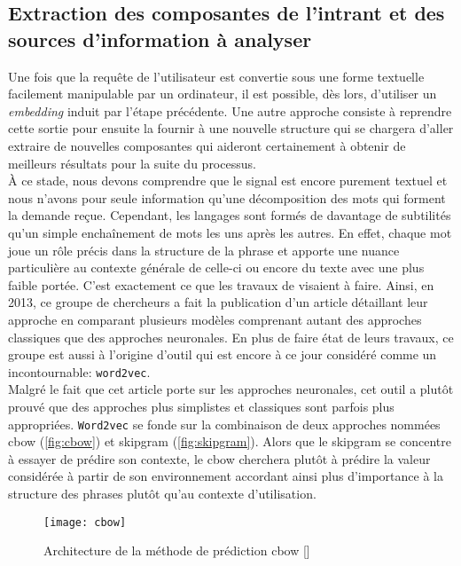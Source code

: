 \subsection{Extraction des composantes de l'intrant et des sources d'information à analyser}
Une fois que la requête de l'utilisateur est convertie sous une forme textuelle facilement manipulable par un ordinateur, il est possible, dès lors, d'utiliser un \textit{embedding} induit par l'étape précédente. Une autre approche consiste à reprendre cette sortie pour ensuite la fournir à une nouvelle structure qui se chargera d'aller extraire de nouvelles composantes qui aideront certainement à obtenir de meilleurs résultats pour la suite du processus. \\

À ce stade, nous devons comprendre que le signal est encore purement textuel et nous n'avons pour seule information qu'une décomposition des mots qui forment la demande reçue. Cependant, les langages sont formés de davantage de subtilités qu'un simple enchaînement de mots les uns après les autres. En effet, chaque mot joue un rôle précis dans la structure de la phrase et apporte une nuance particulière au contexte générale de celle-ci ou encore du texte avec une plus faible portée. C'est exactement ce que les travaux de \cite{word2vec} visaient à faire. Ainsi, en 2013, ce groupe de chercheurs a fait la publication d'un article détaillant leur approche en comparant plusieurs modèles comprenant autant des approches classiques que des approches neuronales. En plus de faire état de leurs travaux, ce groupe est aussi à l'origine d'outil qui est encore à ce jour considéré comme un incontournable: \texttt{word2vec}. \\

Malgré le fait que cet article porte sur les approches neuronales, cet outil a plutôt prouvé que des approches plus simplistes et classiques sont parfois plus appropriées. \texttt{Word2vec} se fonde sur la combinaison de deux approches nommées \gls{cbow} (\autoref{fig:cbow}) et \gls{skipgram} (\autoref{fig:skipgram}). Alors que le \gls{skipgram} se concentre à essayer de prédire son contexte, le \gls{cbow} cherchera plutôt à prédire la valeur considérée à partir de son environnement accordant ainsi plus d’importance à la structure des phrases plutôt qu’au contexte d’utilisation.\\

\begin{figure}[ht]
  \centering
  \texttt{[image: cbow]}
  \caption{Architecture de la méthode de prédiction \gls{cbow} []}
  \label{fig:cbow}
\end{figure}

